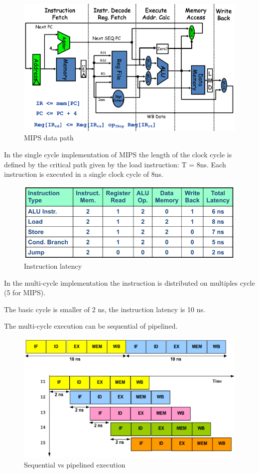 \begin{figure}[h]
    \centering
    \includegraphics[scale = 0.4]{images/MIPS-data-path}
    \caption{MIPS data path}
    \label{fig:mips-data-path}
\end{figure}

In the single cycle implementation of MIPS the length of the clock cycle is defined by the critical path given by the
load instruction: T = 8ns.
Each instruction is executed in a single clock cycle of 8ns.
\begin{figure}[h]
    \centering
    \includegraphics[scale=0.4]{images/instructions-latency}
    \caption{Instruction latency}
    \label{fig:instruction-latency}
\end{figure}

In the multi-cycle implementation the instruction is distributed on multiples cycle (5 for MIPS).

The basic cycle is smaller of 2 ns, the instruction latency is 10 ns.

The multi-cycle execution can be sequential of pipelined.
\begin{figure}[h]
    \centering
    \includegraphics[scale=0.4]{images/sequential-vs-pipelined}
    \caption{Sequential vs pipelined execution}
    \label{fig:sequential-vs-sequential}
\end{figure}

